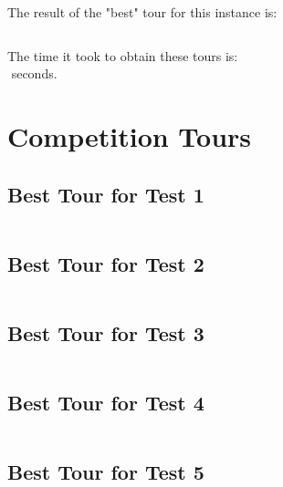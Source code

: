 \documentclass[11pt]{scrreprt}
\begin{document}
The result of the "best" tour for this instance is:\\

\begin{lstlisting}[basicstyle=\small,language=c]

\end{lstlisting}
The time it took to obtain these tours is:\\
$ $ seconds.

\chapter{Competition Tours}
\section{Best Tour for Test 1}

\begin{lstlisting}[basicstyle=\small,language=c]

\end{lstlisting}


\section{Best Tour for Test 2}

\begin{lstlisting}[basicstyle=\small,language=c]

\end{lstlisting}


\section{Best Tour for Test 3}

\begin{lstlisting}[basicstyle=\small,language=c]

\end{lstlisting}


\section{Best Tour for Test 4}

\begin{lstlisting}[basicstyle=\small,language=c]

\end{lstlisting}


\section{Best Tour for Test 5}
\end{document}
